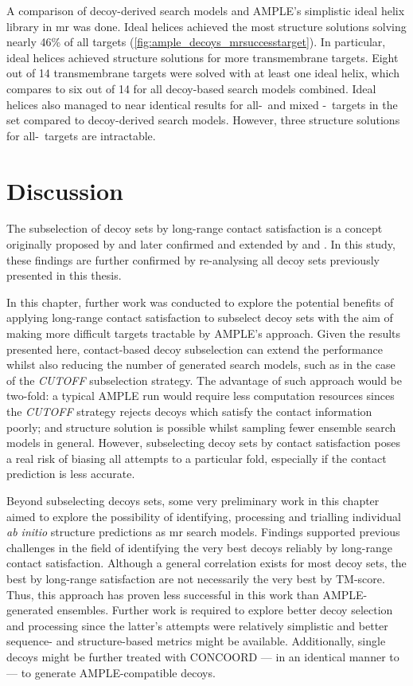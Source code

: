 A comparison of decoy-derived search models and AMPLE's simplistic ideal helix library \cite{Thomas2015-wu} in \gls{mr} was done. Ideal helices achieved the most structure solutions solving nearly 46\% of all targets (\cref{fig:ample_decoys_mrsuccesstarget}). In particular, ideal helices achieved structure solutions for more transmembrane targets. Eight out of 14 transmembrane targets were solved with at least one ideal helix, which compares to six out of 14 for all decoy-based search models combined. Ideal helices also managed to near identical results for all-\textalpha\ and mixed \textalpha-\textbeta\ targets in the set compared to decoy-derived search models. However, three structure solutions for all-\textbeta\ targets are intractable.

\section{Discussion}
The subselection of decoy sets by long-range contact satisfaction is a concept originally proposed by \textcite{Kosciolek2014-bt} and later confirmed and extended by \textcite{De_Oliveira2017-gj} and \textcite{Adhikari2018-lj}. In this study, these findings are further confirmed by re-analysing all decoy sets previously presented in this thesis. 

In this chapter, further work was conducted to explore the potential benefits of applying long-range contact satisfaction to subselect decoy sets with the aim of making more difficult targets tractable by AMPLE's approach. Given the results presented here, contact-based decoy subselection can extend the performance whilst also reducing the number of generated search models, such as in the case of the \textit{CUTOFF} subselection strategy. The advantage of such approach would be two-fold: a typical AMPLE run would require less computation resources sinces the \textit{CUTOFF} strategy rejects decoys which satisfy the contact information poorly; and structure solution is possible whilst sampling fewer ensemble search models in general. However, subselecting decoy sets by contact satisfaction poses a real risk of biasing all attempts to a particular fold, especially if the contact prediction is less accurate.

Beyond subselecting decoys sets, some very preliminary work in this chapter aimed to explore the possibility of identifying, processing and trialling individual \textit{ab initio} structure predictions as \gls{mr} search models. Findings supported previous challenges in the field of identifying the very best decoys reliably by long-range contact satisfaction. Although a general correlation exists for most decoy sets, the best by long-range satisfaction are not necessarily the very best by TM-score. Thus, this approach has proven less successful in this work than AMPLE-generated ensembles. Further work is required to explore better decoy selection and processing since the latter's attempts were relatively simplistic and better sequence- and structure-based metrics might be available. Additionally, single decoys might be further treated with CONCOORD --- in an identical manner to \textcite{Rigden2018-zt} --- to generate AMPLE-compatible decoys.
